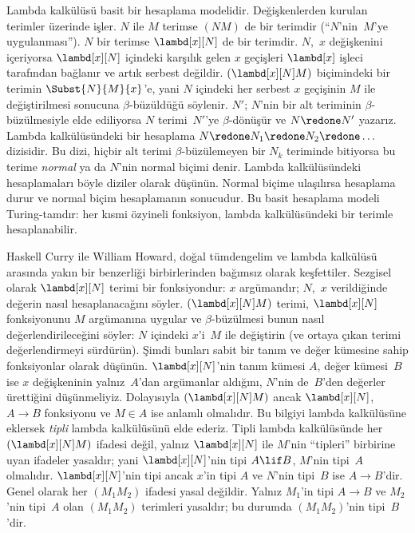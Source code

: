 



Lambda kalkülüsü basit bir hesaplama modelidir. Değişkenlerden kurulan
terimler üzerinde işler. $N$ ile $M$ terimse $(NM)$ de bir terimdir
(``$N$'nin~$M$'ye uygulanması''). $N$ bir terimse $\lambd[x][N]$ de bir
terimdir. $N$,~$x$ değişkenini içeriyorsa $\lambd[x][N]$ içindeki karşılık
gelen $x$ geçişleri $\lambd[x]$ işleci tarafından bağlanır ve artık serbest
değildir. $(\lambd[x][N]M)$ biçimindeki bir terimin $\Subst{N}{M}{x}$'e,
yani $N$ içindeki her serbest $x$ geçişinin $M$ ile değiştirilmesi sonucuna
$\beta$-büzüldüğü söylenir. $N'$; $N$'nin bir alt teriminin
$\beta$-büzülmesiyle elde ediliyorsa $N$ terimi~$N'$'ye $\beta$-dönüşür ve
$N \redone N'$ yazarız. Lambda kalkülüsündeki bir hesaplama $N \redone
N_1 \redone N_2 \redone \dots$ dizisidir. Bu dizi, hiçbir alt terimi
$\beta$-büzülemeyen bir $N_k$ teriminde bitiyorsa bu terime
\emph{normal} ya da $N$'nin normal biçimi denir. Lambda kalkülüsündeki
hesaplamaları böyle diziler olarak düşünün. Normal biçime ulaşılırsa
hesaplama durur ve normal biçim hesaplamanın sonucudur. Bu basit hesaplama
modeli Turing-tamdır: her kısmi özyineli fonksiyon, lambda kalkülüsündeki
bir terimle hesaplanabilir.

Haskell Curry ile William Howard, doğal tümdengelim ve lambda kalkülüsü
arasında yakın bir benzerliği birbirlerinden bağımsız olarak keşfettiler.
Sezgisel olarak $\lambd[x][N]$ terimi bir fonksiyondur: $x$ argümandır;
$N$,~$x$ verildiğinde değerin nasıl hesaplanacağını söyler.
$(\lambd[x][N]M)$ terimi, $\lambd[x][N]$ fonksiyonunu $M$ argümanına
uygular ve $\beta$-büzülmesi bunun nasıl değerlendirileceğini söyler:
$N$ içindeki $x$'i~$M$ ile değiştirin (ve ortaya çıkan terimi
değerlendirmeyi sürdürün). Şimdi bunları sabit bir tanım ve değer kümesine
sahip fonksiyonlar olarak düşünün. $\lambd[x][N]$'nin tanım kümesi $A$,
değer kümesi~$B$ ise $x$ değişkeninin yalnız~$A$'dan argümanlar aldığını,
$N$'nin de~$B$'den değerler ürettiğini düşünmeliyiz. Dolayısıyla
$(\lambd[x][N]M)$ ancak $\lambd[x][N]$, $A \to B$ fonksiyonu ve $M \in A$
ise anlamlı olmalıdır. Bu bilgiyi lambda kalkülüsüne eklersek \emph{tipli}
lambda kalkülüsünü elde ederiz. Tipli lambda kalkülüsünde her
$(\lambd[x][N]M)$ ifadesi değil, yalnız $\lambd[x][N]$ ile $M$'nin
``tipleri'' birbirine uyan ifadeler yasaldır; yani $\lambd[x][N]$'nin tipi
$A \lif B$, $M$'nin tipi~$A$ olmalıdır. $\lambd[x][N]$'nin tipi ancak
$x$'in tipi $A$ ve $N$'nin tipi~$B$ ise $A \to B$'dir. Genel olarak her
$(M_1M_2)$ ifadesi yasal değildir. Yalnız $M_1$'in tipi $A \to B$ ve
$M_2$'nin tipi~$A$ olan $(M_1M_2)$ terimleri yasaldır; bu durumda
$(M_1M_2)$'nin tipi~$B$'dir.

